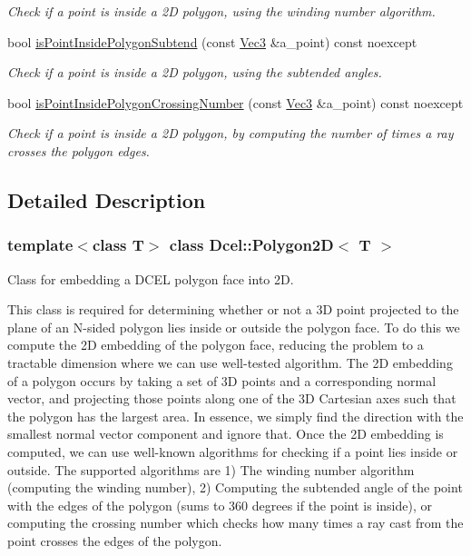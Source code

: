 \begin{DoxyCompactItemize}
\begin{DoxyCompactList}\small\item\em Check if a point is inside a 2D polygon, using the winding number algorithm. \end{DoxyCompactList}\item 
bool \hyperlink{classDcel_1_1Polygon2D_a8a6a32defe11ad15996e286aa76d4428}{is\+Point\+Inside\+Polygon\+Subtend} (const \hyperlink{classDcel_1_1Polygon2D_a46e9686210f09464e8f5ad13300717b9}{Vec3} \&a\+\_\+point) const noexcept
\begin{DoxyCompactList}\small\item\em Check if a point is inside a 2D polygon, using the subtended angles. \end{DoxyCompactList}\item 
bool \hyperlink{classDcel_1_1Polygon2D_aa1edee7ad8913b35663792624e914aad}{is\+Point\+Inside\+Polygon\+Crossing\+Number} (const \hyperlink{classDcel_1_1Polygon2D_a46e9686210f09464e8f5ad13300717b9}{Vec3} \&a\+\_\+point) const noexcept
\begin{DoxyCompactList}\small\item\em Check if a point is inside a 2D polygon, by computing the number of times a ray crosses the polygon edges. \end{DoxyCompactList}\end{DoxyCompactItemize}


\subsection{Detailed Description}
\subsubsection*{template$<$class T$>$\newline
class Dcel\+::\+Polygon2\+D$<$ T $>$}

Class for embedding a D\+C\+EL polygon face into 2D. 

This class is required for determining whether or not a 3D point projected to the plane of an N-\/sided polygon lies inside or outside the polygon face. To do this we compute the 2D embedding of the polygon face, reducing the problem to a tractable dimension where we can use well-\/tested algorithm. The 2D embedding of a polygon occurs by taking a set of 3D points and a corresponding normal vector, and projecting those points along one of the 3D Cartesian axes such that the polygon has the largest area. In essence, we simply find the direction with the smallest normal vector component and ignore that. Once the 2D embedding is computed, we can use well-\/known algorithms for checking if a point lies inside or outside. The supported algorithms are 1) The winding number algorithm (computing the winding number), 2) Computing the subtended angle of the point with the edges of the polygon (sums to 360 degrees if the point is inside), or computing the crossing number which checks how many times a ray cast from the point crosses the edges of the polygon. 

